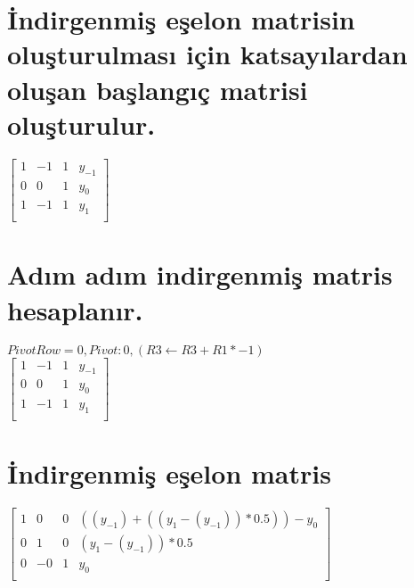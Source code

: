\documentclass{article}
\begin{document}
\section{İndirgenmiş eşelon matrisin oluşturulması için katsayılardan oluşan başlangıç matrisi oluşturulur.}
\begin{center}
$\begin{bmatrix}
1&-1&1&y_{-1}\\
0&0&1&y_{0}\\
1&-1&1&y_{1}\\
\end{bmatrix} $ 
\end{center}

\section{Adım adım indirgenmiş matris hesaplanır.}
\begin{center}
$PivotRow= 0, Pivot: 0, (R3 \leftarrow R3 + R1 * -1) $\\
$\begin{bmatrix}
1&-1&1&y_{-1}\\
0&0&1&y_{0}\\
1&-1&1&y_{1}\\
\end{bmatrix} $ 
\end{center}

\section{İndirgenmiş eşelon matris}
\begin{center}
$\begin{bmatrix}
1&0&0&((y_{-1}) + ((y_{1} - (y_{-1})) * 0.5)) - y_{0}\\
0&1&0&(y_{1} - (y_{-1})) * 0.5\\
0&-0&1&y_{0}\\
\end{bmatrix} $ 
\end{center}
\end{document}
